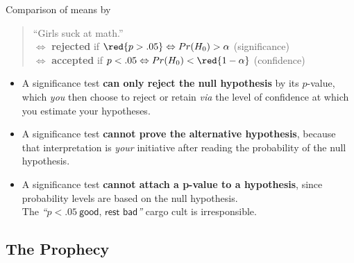 \documentclass{beamer}
\begin{document}
	\begin{frame}[t]{Comparison of means by }
					
		\begin{quote}
		``Girls suck at math.''\\
		$\Leftrightarrow$ \textbf{rejected} if $\red{p > .05} \Leftrightarrow Pr(H_0) > \alpha$ (significance)\\
		$\Leftrightarrow$ \textbf{accepted} if $p < .05 \Leftrightarrow Pr(H_0) < \red{1-\alpha}$ (confidence)
		\end{quote}

		\begin{itemize}
 			\item A significance test \textbf{can only reject the null hypothesis} by  its $p$-value, which \textit{you} then choose to reject or retain \textit{via} the level of confidence at which you estimate your hypotheses.
 			\item A significance test \textbf{cannot prove the alternative hypothesis}, because that interpretation is \textit{your} initiative after reading the  probability of the null hypothesis.
 			\item A significance test \textbf{cannot attach a p-value to a hypothesis}, since probability levels are  based on the null hypothesis.\\
 			The \textit{``$p < .05~\textsf{good, rest bad}$''} cargo cult is irresponsible.	
		\end{itemize}
	\end{frame}
	
	\subsection*{The Prophecy}


\end{document}
